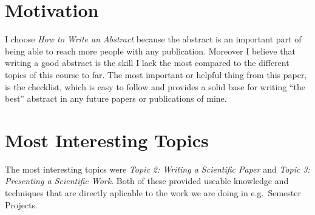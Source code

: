 \section{Motivation}
I choose \textit{How to Write an Abstract} because the abstract is an important part of being able to reach more people with any publication.
Moreover I believe that writing a good abstract is the skill I lack the most compared to the different topics of this course to far.
The most important or helpful thing from this paper, is the checklist, which is easy to follow and provides a solid base for writing \enquote{the best} abstract in any future papers or publications of mine.

\section{Most Interesting Topics}
The most interesting topics were \textit{Topic 2: Writing a Scientific Paper} and \textit{Topic 3: Presenting a Scientific Work}.
Both of these provided useable knowledge and techniques that are directly aplicable to the work we are doing in e.g.\ Semester Projects.
